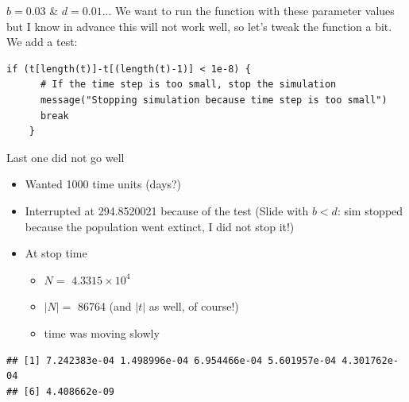 \documentclass[aspectratio=169]{beamer}
\begin{document}




\begin{frame}[fragile]{$b=0.03$ \& $d=0.01$...}
We want to run the function with these parameter values but I know in advance this will not work well, so let's tweak the function a bit. We add a test:
\vfill
\begin{lstlisting}
if (t[length(t)]-t[(length(t)-1)] < 1e-8) {
      # If the time step is too small, stop the simulation
      message("Stopping simulation because time step is too small")
      break
    }
\end{lstlisting}
\vfill
\end{frame}









\begin{frame}[fragile]{Last one did not go well}
    \begin{itemize}
        \item Wanted 1000 time units (days?)
        \item Interrupted at 294.8520021 because of the test
        \newline (Slide with $b<d$: sim stopped because the population went extinct, I did not stop it!)
        \item At stop time
        \begin{itemize}
            \item $N =$ \ensuremath{4.3315\times 10^{4}}
            \item $|N| =$ 86764 (and $|t|$ as well, of course!)
            \item time was moving slowly
        \end{itemize}
    \end{itemize}
    \vfill
    
\begin{knitrout}
\color{fgcolor}\begin{kframe}
\begin{alltt}
\hldef{(}\hlopt{$}
\end{alltt}
\begin{verbatim}
## [1] 7.242383e-04 1.498996e-04 6.954466e-04 5.601957e-04 4.301762e-04
## [6] 4.408662e-09
\end{verbatim}
\end{kframe}
\end{knitrout}

\end{frame}
\end{document}
